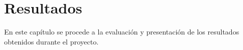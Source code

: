 \chapter{Resultados}\label{cap5}


En este capítulo se procede a la evaluación y presentación de los resultados obtenidos durante el proyecto.